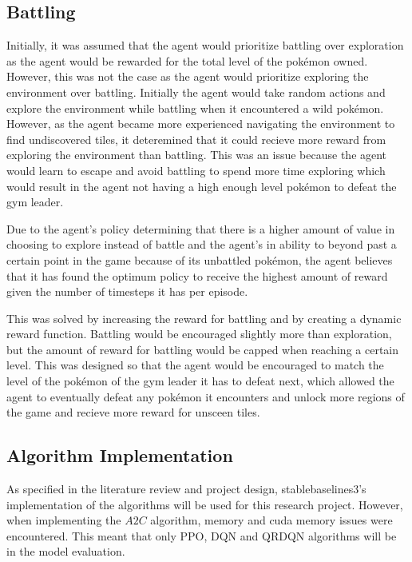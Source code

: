 \subsection{Battling}

Initially, it was assumed that the agent would prioritize battling over exploration as the agent would be rewarded for the total level of the pokémon owned. However, this was not the case as the agent would prioritize exploring the environment over battling. Initially the agent would take random actions and explore the environment while battling when it encountered a wild pokémon. However, as the agent became more experienced navigating the environment to find undiscovered tiles, it deteremined that it could recieve more reward from exploring the environment than battling. This was an issue because the agent would learn to escape and avoid battling to spend more time exploring which would result in the agent not having a high enough level pokémon to defeat the gym leader. 

Due to the agent's policy determining that there is a higher amount of value in choosing to explore instead of battle and the agent's in ability to beyond past a certain point in the game because of its unbattled pokémon, the agent believes that it has found the optimum policy to receive the highest amount of reward given the number of timesteps it has per episode. 

This was solved by increasing the reward for battling and by creating a dynamic reward function. Battling would be encouraged slightly more than exploration, but the amount of reward for battling would be capped when reaching a certain level. This was designed so that the agent would be encouraged to match the level of the pokémon of the gym leader it has to defeat next, which allowed the agent to eventually defeat any pokémon it encounters and unlock more regions of the game and recieve more reward for unsceen tiles.

\subsection{Algorithm Implementation}

As specified in the literature review and project design, stablebaselines3's implementation of the algorithms will be used for this research project. However, when implementing the $A2C$ algorithm, memory and cuda memory issues were encountered. This meant that only PPO, DQN and QRDQN algorithms will be in the model evaluation. 

